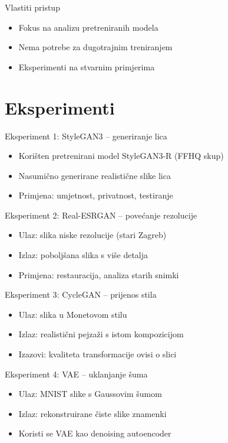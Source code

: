 \documentclass[aspectratio=169, xcolor=dvipsnames]{beamer}
\begin{document}
	\begin{frame}{Vlastiti pristup}
		\begin{itemize}
			\item Fokus na analizu pretreniranih modela
			\item Nema potrebe za dugotrajnim treniranjem
			\item Eksperimenti na stvarnim primjerima
		\end{itemize}
	\end{frame}
	
	\section{Eksperimenti}
	
	\begin{frame}{Eksperiment 1: StyleGAN3 – generiranje lica}
		\begin{itemize}
			\item Korišten pretrenirani model StyleGAN3-R (FFHQ skup)
			\item Nasumično generirane realistične slike lica
			\item Primjena: umjetnost, privatnost, testiranje
		\end{itemize}
	\end{frame}
	
	\begin{frame}{Eksperiment 2: Real-ESRGAN – povećanje rezolucije}
		\begin{itemize}
			\item Ulaz: slika niske rezolucije (stari Zagreb)
			\item Izlaz: poboljšana slika s više detalja
			\item Primjena: restauracija, analiza starih snimki
		\end{itemize}
	\end{frame}
	
	\begin{frame}{Eksperiment 3: CycleGAN – prijenos stila}
		\begin{itemize}
			\item Ulaz: slika u Monetovom stilu
			\item Izlaz: realistični pejzaži s istom kompozicijom
			\item Izazovi: kvaliteta transformacije ovisi o slici
		\end{itemize}
	\end{frame}
	
	\begin{frame}{Eksperiment 4: VAE – uklanjanje šuma}
		\begin{itemize}
			\item Ulaz: MNIST slike s Gaussovim šumom
			\item Izlaz: rekonstruirane čiste slike znamenki
			\item Koristi se VAE kao denoising autoencoder
		\end{itemize}
	\end{frame}
	
\end{document}

